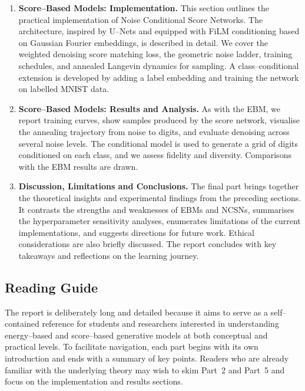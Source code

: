 \begin{enumerate}[leftmargin=*,label=\arabic*.]
    demonstrate its independence from the partition function, and derive the
    denoising score matching objective.  The difficulties of computing
    divergence terms in the original score matching formulation are
    explained, and multi–scale noise perturbation is presented as a remedy.
    We also revisit the mixture–of–Gaussians example to show why the score
    ignores mixing weights.  Connections to stochastic differential
    equations and diffusion processes are highlighted.
  \item \textbf{Score–Based Models: Implementation.}  This section outlines
    the practical implementation of Noise Conditional Score Networks.  The
    architecture, inspired by U–Nets and equipped with FiLM conditioning
    based on Gaussian Fourier embeddings, is described in detail.  We cover
    the weighted denoising score matching loss, the geometric noise ladder,
    training schedules, and annealed Langevin dynamics for sampling.  A
    class–conditional extension is developed by adding a label embedding and
    training the network on labelled MNIST data.
  \item \textbf{Score–Based Models: Results and Analysis.}  As with the
    EBM, we report training curves, show samples produced by the score
    network, visualise the annealing trajectory from noise to digits, and
    evaluate denoising across several noise levels.  The conditional model
    is used to generate a grid of digits conditioned on each class, and we
    assess fidelity and diversity.  Comparisons with the EBM results are
    drawn.
  \item \textbf{Discussion, Limitations and Conclusions.}  The final part
    brings together the theoretical insights and experimental findings from
    the preceding sections.  It contrasts the strengths and weaknesses of
    EBMs and NCSNs, summarises the hyperparameter sensitivity analyses,
    enumerates limitations of the current implementations, and suggests
    directions for future work.  Ethical considerations are also briefly
    discussed.  The report concludes with key takeaways and reflections on
    the learning journey.
\end{enumerate}

\subsection{Reading Guide}

The report is deliberately long and detailed because it aims to serve as a
self–contained reference for students and researchers interested in
understanding energy–based and score–based generative models at both
conceptual and practical levels.  To facilitate navigation, each part begins
with its own introduction and ends with a summary of key points.  Readers
who are already familiar with the underlying theory may wish to skim
Part~2 and Part~5 and focus on the implementation and results sections.

